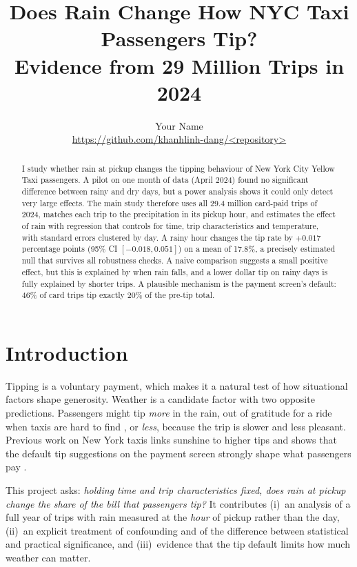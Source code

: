 \documentclass[11pt,a4paper]{article}
\title{Does Rain Change How NYC Taxi Passengers Tip?\\
\large Evidence from 29 Million Trips in 2024}
\author{Your Name\\\small\url{https://github.com/khanhlinh-dang/<repository>}}
\date{}
\begin{document}
\maketitle

\begin{abstract}
\noindent
I study whether rain at pickup changes the tipping behaviour of New York City Yellow Taxi passengers. A pilot on
one month of data (April 2024) found no significant difference between rainy and dry days, but a power analysis
shows it could only detect very large effects. The main study therefore uses all \num{29.4} million card-paid
trips of 2024, matches each trip to the precipitation in its pickup hour, and estimates the effect of rain with
regression that controls for time, trip characteristics and temperature, with standard errors clustered by day.
A rainy hour changes the tip rate by $+0.017$ percentage points (95\% CI $[-0.018, 0.051]$) on a mean of
17.8\%, a precisely estimated null that survives all robustness checks. A naive comparison suggests a small
positive effect, but this is explained by when rain falls, and a lower dollar tip on rainy days is fully
explained by shorter trips. A plausible mechanism is the payment screen's default: 46\% of card trips tip exactly
20\% of the pre-tip total.
\end{abstract}

\section{Introduction}
Tipping is a voluntary payment, which makes it a natural test of how situational factors shape generosity.
Weather is a candidate factor with two opposite predictions. Passengers might tip \emph{more} in the rain, out of
gratitude for a ride when taxis are hard to find \cite{farber2015}, or \emph{less}, because the trip is slower
and less pleasant. Previous work on New York taxis links sunshine to higher tips \cite{devaraj2017} and shows
that the default tip suggestions on the payment screen strongly shape what passengers pay \cite{haggag2014}.

This project asks: \emph{holding time and trip characteristics fixed, does rain at pickup change the share of
the bill that passengers tip?} It contributes (i)~an analysis of a full year of trips with rain measured at the
\emph{hour} of pickup rather than the day, (ii)~an explicit treatment of confounding and of the difference
between statistical and practical significance, and (iii)~evidence that the tip default limits how much weather
can matter.
\end{document}
